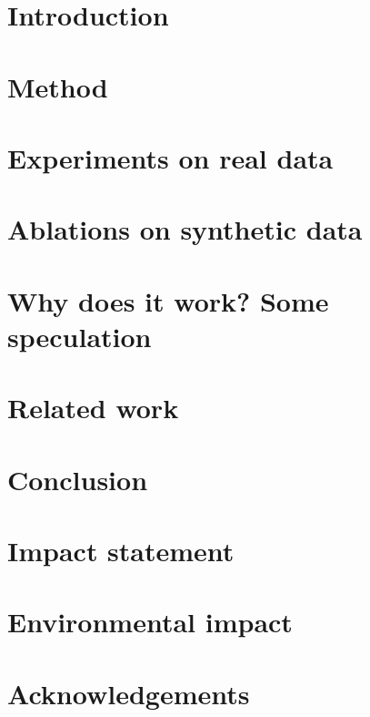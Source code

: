 \documentclass{article}
\theoremstyle{plain}
\theoremstyle{definition}
\theoremstyle{remark}
\begin{document}
\section{Introduction}


\section{Method}


\section{Experiments on real data}


\section{Ablations on synthetic data}


\section{Why does it work? Some speculation}


\section{Related work}


\section{Conclusion}


\section*{Impact statement}


\section*{Environmental impact}


\section*{Acknowledgements}


\clearpage






\clearpage
\newpage

\end{document}

